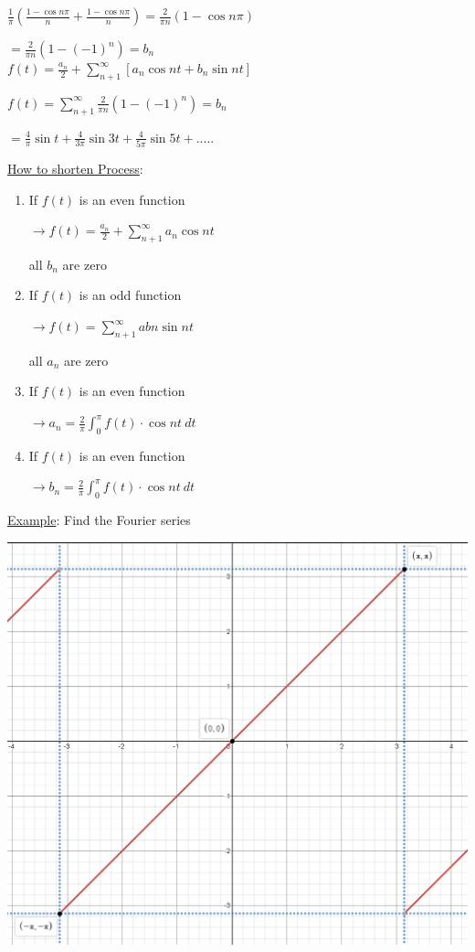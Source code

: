 \documentclass[12pt]{article}
\numberwithin{equation}{subsection}
\newcommand{\indb}{\hspace{1cm}}
\newcommand{\indd}{\hspace{2cm}}
\newcommand{\indf}{\hspace{3cm}}
\newcommand{\indk}{\hspace{5.5cm}}
\newcommand{\indu}{\hspace{10.5cm}}
\newcommand{\exa}{\noindent \underline{Example}: \hspace{1cm}}
\begin{document}
\indk $\displaystyle \frac{1}{\pi} \left( \frac{1-\cos n\pi}{n} + \frac{1-\cos n\pi}{n}\right)= \frac{2}{\pi n}(1 - \cos n \pi)$

\indu $\displaystyle =\frac{2}{\pi n}(1-(-1)^n)= b_n$\\

\indd $\displaystyle f(t)= \frac{a_n}{2} + \sum_{n+1}^{\infty}[a_n \cos nt + b_n \sin nt] $

\indd $\displaystyle f(t)=\sum_{n+1}^{\infty} \frac{2}{\pi n}(1-(-1)^n)= b_n$

\indf $= \frac{4}{\pi} \sin t+ \frac{4}{3\pi} \sin 3t+ \frac{4}{5\pi} \sin 5t+ .....$


\newpage
\underline{How to shorten Process}:
\begin{enumerate}
\item If $f(t)$ is an even function

\indb $\rightarrow f(t)= \frac{a_n}{2} + \sum_{n+1}^{\infty}a_n \cos nt$

\indd all $b_n$ are zero

\item If $f(t)$ is an odd function

\indb $\rightarrow f(t)= \sum_{n+1}^{\infty}abn \sin nt$

\indd all $a_n$ are zero

\item If $f(t)$ is an even function

\indb $\rightarrow a_n = \frac{2}{\pi} \int_{0}^{\pi} f(t) \cdot \cos nt\ dt$


\item If $f(t)$ is an even function

\indb $\rightarrow b_n = \frac{2}{\pi} \int_{0}^{\pi} f(t) \cdot \cos nt\ dt$

\end{enumerate}

\exa Find the Fourier series

\includegraphics[scale=.25]{ExampleF1}
\end{document}
